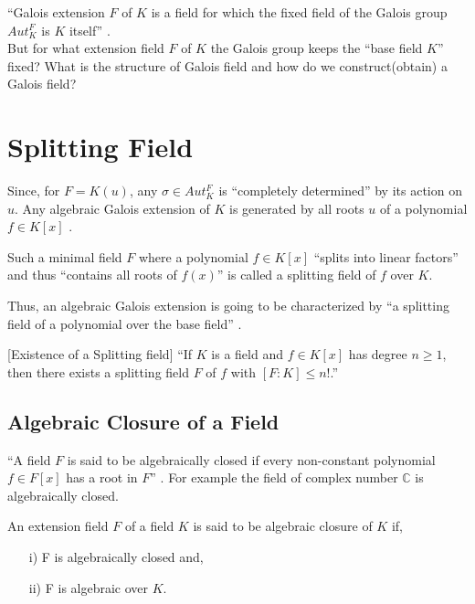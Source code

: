 ``Galois extension \(F\) of  \(K\) is a field for which the fixed field of the Galois group \(Aut_K^F\) is \(K\) itself'' \cite{hunger}.\\
But for what extension field \(F\) of \(K\) the Galois group keeps the ``base field \(K\)'' fixed? What is the structure of Galois field and how do we construct(obtain) a Galois field?


\section{Splitting Field}
Since, for \(F=K(u)\), any \(\sigma \in Aut_K^F\) is ``completely determined'' \cite{hunger} by its action on \(u\). Any algebraic Galois extension of \(K\) is generated by all roots \(u\) of a polynomial \(f \in K[x]\) \cite{hunger}.

\begin{definition} \cite{hunger}
  Such a minimal field \(F\) where a polynomial \(f \in K[x]\) ``splits into linear factors'' and thus ``contains all roots of \(f(x)\)'' is called a splitting field of \(f\) over \(K\).
\end{definition}
Thus, an algebraic Galois extension is going to be characterized by ``a splitting field of a polynomial over the base field'' \cite{hunger}.
\vspace{3mm}

\begin{theorem} \cite{hunger} [Existence of a Splitting field]
  ``If \(K\) is a field and \(f \in K[x]\) has degree \(n \geq 1\), then there exists a splitting field \(F\) of \(f\) with \([F:K] \leq n!\).''
  \end{theorem}

\subsection{Algebraic Closure of a Field}
``A field \(F\) is said to be algebraically closed if every non-constant polynomial \(f \in F[x]\) has a root in \(F\)'' \cite{hunger}.
For example the field of complex number \(\mathbb{C}\) is algebraically closed.\\[3mm]

\begin{definition} \cite{hunger}
An extension field \(F\) of a field \(K\) is said to be algebraic closure of \(K\) if,
\begin{enumerate}
\item[i)] F is algebraically closed and,
  \item[ii)] F is algebraic over \(K\).
  \end{enumerate}
\end{definition}


